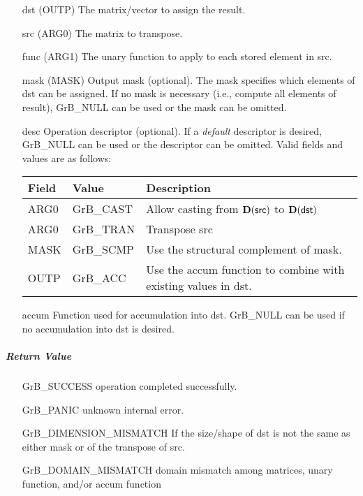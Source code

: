 \begin{itemize}[leftmargin=1.1in]
    \item[{\sf dst}]   ({\sf OUTP}) The matrix/vector to assign the result.
    \item[{\sf src}]   ({\sf ARG0}) The matrix to transpose.
    \item[{\sf func}]  ({\sf ARG1}) The unary function to apply to each stored element in src.

    \item[{\sf mask}]  ({\sf MASK}) Output mask (optional). The mask
    specifies which elements of {\sf dst} can be assigned.
    If no mask is necessary (i.e., compute all elements of result),
    {\sf GrB\_NULL} can be used or the mask can be omitted.

    \item[{\sf desc}]   Operation descriptor (optional). If a
    \emph{default} descriptor is desired, {\sf GrB\_NULL} can be
    used or the descriptor can be omitted.  Valid fields and values are as follows: \\
    \begin{tabular}{lll}
    Field  & Value & Description \\
    \hline
    {\sf ARG0} & {\sf GrB\_CAST} & Allow casting from $\bold{D}({\sf src})$ to $\bold{D}({\sf dst})$ \\
    {\sf ARG0} & {\sf GrB\_TRAN} & Transpose {\sf src} \\
    {\sf MASK} & {\sf GrB\_SCMP} & Use the structural complement of {\sf mask}. \\
    {\sf OUTP}& {\sf GrB\_ACC}  & Use the {\sf accum} function to combine with existing values in {\sf dst}.\\
    \end{tabular}

    \item[{\sf accum}] Function used for accumulation into dst.  {\sf GrB\_NULL}
                       can be used if no accumulation into dst is desired.
\end{itemize}

\subparagraph{Return Value}


\begin{itemize}[leftmargin=2.1in]
\item[{\sf GrB\_SUCCESS}]     operation completed successfully.
\item[{\sf GrB\_PANIC}]        unknown internal error.
\item[{\sf GrB\_DIMENSION\_MISMATCH}]            
        If the size/shape of dst is not the same as either mask or
        of the transpose of src.
\item[{\sf GrB\_DOMAIN\_MISMATCH}]  
        domain mismatch among matrices, unary function, and/or
        accum function 
\end{itemize}

